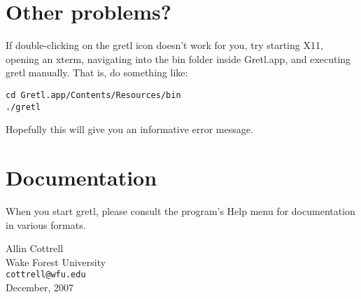 \documentclass[11pt]{article}
\begin{document}
\section{Other problems?}

If double-clicking on the gretl icon doesn't work for you, try
starting X11, opening an xterm, navigating into the \textsf{bin}
folder inside \textsf{Gretl.app}, and executing \textsf{gretl}
manually.  That is, do something like:

\begin{verbatim}
cd Gretl.app/Contents/Resources/bin
./gretl
\end{verbatim}

Hopefully this will give you an informative error message.

\section{Documentation}
\label{sec:doc}

When you start gretl, please consult the program's Help menu for
documentation in various formats.

\vspace{.25in}

\raggedright
Allin Cottrell \\
Wake Forest University \\
\texttt{cottrell@wfu.edu} \\
December, 2007
\end{document}
